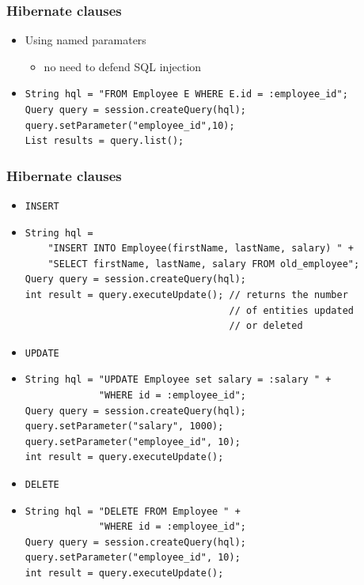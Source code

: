\documentclass[10pt,xcolor=pdflatex]{beamer}
\begin{document}
\begin{frame}[fragile]\frametitle{Hibernate clauses}
	\begin{itemize}
		\item Using named paramaters
          \begin{itemize}
            \item no need to defend SQL injection
          \end{itemize}
        \item[] \footnotesize \lstset{language=Java}
                \begin{lstlisting}   
String hql = "FROM Employee E WHERE E.id = :employee_id";
Query query = session.createQuery(hql);
query.setParameter("employee_id",10);
List results = query.list();                
                \end{lstlisting}            
    \end{itemize}
\end{frame}


\begin{frame}[fragile]\frametitle{Hibernate clauses}
	\begin{itemize}
    	\item \texttt{INSERT}
        \item[]
            \begin{footnotesize}
            \lstset{language=Java}
            \begin{lstlisting}         
String hql = 
    "INSERT INTO Employee(firstName, lastName, salary) " + 
    "SELECT firstName, lastName, salary FROM old_employee";
Query query = session.createQuery(hql);
int result = query.executeUpdate(); // returns the number 
                                    // of entities updated 
                                    // or deleted
            \end{lstlisting} \end{footnotesize}
		\item \texttt{UPDATE}
        \item[]
        	\begin{footnotesize}
			\lstset{language=Java}
            \begin{lstlisting}        
String hql = "UPDATE Employee set salary = :salary " + 
             "WHERE id = :employee_id";
Query query = session.createQuery(hql);
query.setParameter("salary", 1000);
query.setParameter("employee_id", 10);
int result = query.executeUpdate();
            \end{lstlisting} \end{footnotesize}
		\item \texttt{DELETE}
        \item[]
            \begin{footnotesize}
			\lstset{language=Java}
            \begin{lstlisting}   
String hql = "DELETE FROM Employee " + 
             "WHERE id = :employee_id";
Query query = session.createQuery(hql);
query.setParameter("employee_id", 10);
int result = query.executeUpdate();
            \end{lstlisting} \end{footnotesize}
	\end{itemize}
\end{frame}
\end{document}
